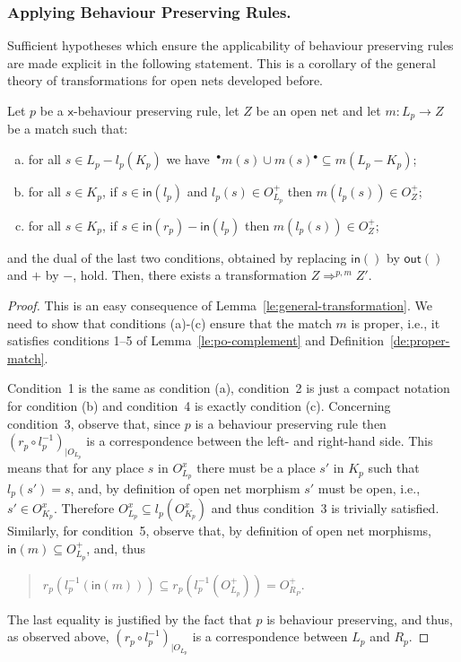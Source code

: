 \documentclass{LMCS}
\newcommand{\inp}[1]{\ensuremath{\mathsf{in}({#1})}}
\newcommand{\out}[1]{\ensuremath{\mathsf{out}({#1})}}
\newcommand{\pre}[1][(\cdot)]{\ensuremath{\!~^\bullet{#1}}}
\newcommand{\post}[1][(\cdot)]{\ensuremath{{#1} {^\bullet}}}
\newcommand{\rew}[1]{\Rightarrow^{#1}}
\begin{document}
\subsubsection{Applying Behaviour Preserving Rules.}

Sufficient hypotheses which ensure the applicability of behaviour
preserving rules are made explicit in the following statement. This is
a corollary of the general theory of transformations for open nets
developed before.  



\begin{cor}
  \label{co:proper}
  Let $p$ be a $\mathsf{x}$-behaviour preserving rule, let $Z$ be an
  open net and let $m : L_p \to Z$ be a match such that:
  \begin{enumerate}[a.]
    


  \item for all $s \in L_p - l_p(K_p)$ we have $\pre[m(s)] \cup \post[m(s)]
     \subseteq m(L_p - K_p)$;
 
  \item for all $s \in K_p$, if $s \in \inp{l_p}$ and $l_p(s) \in
    O_{L_p}^+$ then $m(l_p(s)) \in O_Z^+$;

  \item for all $s \in K_p$, if $s \in \inp{r_p} - \inp{l_p}$ 
    then $m(l_p(s)) \in O_Z^+$;


  \end{enumerate}
  and the dual of the last two conditions, obtained by replacing 
  $\inp{}$ by $\out{}$ and $+$ by $-$, hold.
Then, there exists a transformation $Z \rew{p,m} Z'$.
\end{cor}

\begin{proof}
  This is an easy consequence of Lemma~\ref{le:general-transformation}.
We need to show that conditions (a)-(c) ensure that the match $m$
  is proper, i.e., it satisfies conditions 1--5 of
  Lemma~\ref{le:po-complement} and Definition~\ref{de:proper-match}.
  
  Condition~1 is the same as condition (a), condition~2 is just a
  compact notation for condition (b) and condition~4 is exactly
  condition (c).
Concerning condition~3, observe that, since $p$ is a behaviour
  preserving rule then $(r_p \circ l_p^{-1})_{|O_{L_p}}$ is a
  correspondence between the left- and right-hand side. 
This means
  that for any place $s$ in $O_{L_p}^x$ there must be a place $s'$ in
  $K_p$ such that $l_p(s') = s$, and, by definition of open net
  morphism $s'$ must be open, i.e., $s' \in O_{K_p}^x$. Therefore
  $O_{L_p}^x \subseteq l_p(O_{K_p}^x)$ and thus condition~3 is
  trivially satisfied.  
Similarly, for condition~5, observe that, by definition of open net
  morphisms, $\inp{m} \subseteq O_{L_p}^+$, and, thus
  \begin{quote}
    $r_p(l_p^{-1}(\inp{m})) \subseteq r_p(l_p^{-1}(O_{L_p}^+)) = O_{R_P}^+$.
  \end{quote}
  The last equality is justified by the fact that $p$ is behaviour
  preserving, and thus, as observed above, $(r_p \circ
  l_p^{-1})_{|O_{L_p}}$ is a correspondence between $L_p$ and $R_p$.
\end{proof}
\end{document}
